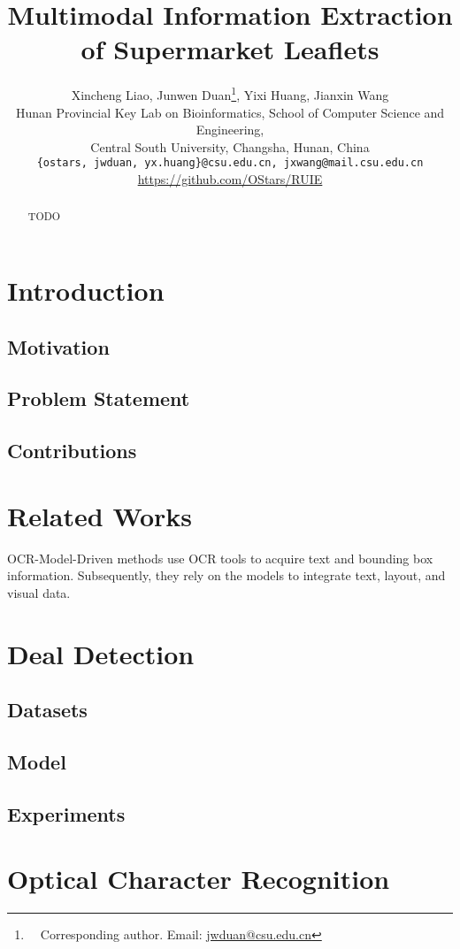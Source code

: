 \documentclass[11pt]{article}
\title{Multimodal Information Extraction of Supermarket Leaflets}
\author{Xincheng Liao\textsuperscript{}, Junwen Duan\textsuperscript{}\thanks{\ \ Corresponding author. Email: \href{mailto:jwduan@csu.edu.cn}{jwduan@csu.edu.cn}}, Yixi Huang\textsuperscript{}, Jianxin Wang\textsuperscript{} \\
Hunan Provincial Key Lab on Bioinformatics, School of Computer Science and Engineering, \\
Central South University, Changsha, Hunan, China \\
\texttt{\{ostars, jwduan, yx.huang\}@csu.edu.cn, jxwang@mail.csu.edu.cn} \\
\href{https://github.com/OStars/RUIE}{https://github.com/OStars/RUIE}
}
\begin{document}
\maketitle
\begin{abstract}
TODO
\end{abstract}

\section{Introduction}
\subsection{Motivation}
\subsection{Problem Statement}
\subsection{Contributions}

\section{Related Works}
OCR-Model-Driven methods use OCR tools to acquire text
and bounding box information. Subsequently, they rely
on the models to integrate text, layout, and visual data.


\section{Deal Detection}
    \subsection{Datasets}
    \subsection{Model}
    \subsection{Experiments}

\section{Optical Character Recognition}
\end{document}

